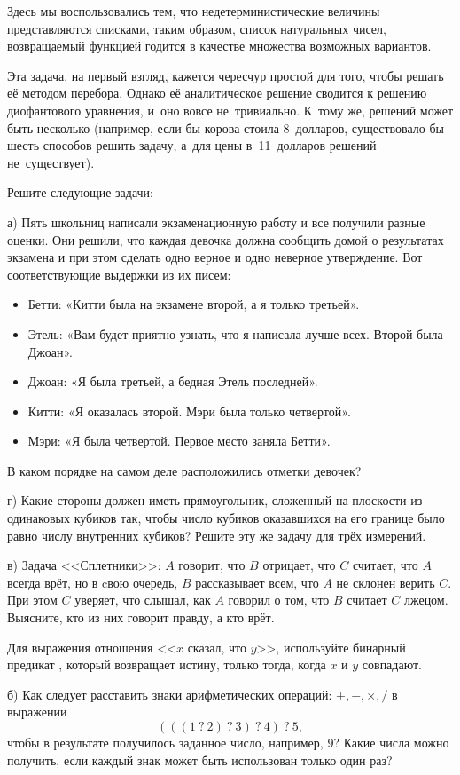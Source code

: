 Здесь мы воспользовались тем, что недетерминистические величины представляются списками, таким образом, список натуральных чисел, возвращаемый функцией  годится в качестве множества возможных вариантов.

Эта задача, на первый взгляд, кажется чересчур простой для того, чтобы решать её методом перебора. Однако её аналитическое решение сводится к решению диофантового уравнения, и~оно вовсе не~тривиально. К~тому же, решений может быть несколько (например, если бы корова стоила 8~долларов, существовало бы шесть способов решить задачу, а~для цены в~11~долларов решений не~существует).

\begin{Assignment}
Решите следующие задачи:

\medskip
а) Пять школьниц написали экзаменационную работу и все получили разные оценки. Они решили, что каждая девочка должна сообщить домой о результатах экзамена и при этом сделать одно верное и
одно неверное утверждение. Вот соответствующие выдержки из их писем:
\begin{itemize}
  \item Бетти: «Китти была на экзамене второй, а я только третьей».
  \item Этель: «Вам будет приятно узнать, что я написала лучше всех. Второй была Джоан».
  \item Джоан: «Я была третьей, а бедная Этель последней».
  \item Китти: «Я оказалась второй. Мэри была только четвертой».
  \item Мэри: «Я была четвертой. Первое место заняла Бетти».
\end{itemize}
 В каком порядке на самом деле расположились отметки девочек?
 
 \medskip
 г)\label{as:rectangles} Какие стороны должен иметь прямоугольник, сложенный на плоскости из одинаковых кубиков так, чтобы число кубиков оказавшихся на его границе было равно числу внутренних кубиков? Решите эту же задачу для трёх измерений.

  \medskip
 в) Задача <<Сплетники>>: $A$ говорит, что $B$ отрицает, что $C$ считает, что $A$ всегда врёт, но в cвою очередь, $B$ рассказывает всем, что $A$ не склонен верить $C$. При этом $C$ уверяет, что слышал, как $A$ говорил о том, что $B$ считает $C$ лжецом. Выясните, кто из них говорит правду, а кто врёт.
 
 Для выражения отношения <<$x$ сказал, что $y$>>, используйте бинарный предикат , который возвращает истину, только тогда, когда $x$ и $y$ совпадают.

\medskip
 б) Как следует расставить знаки арифметических операций: $+, -, \times, /$ в выражении $$(((1~?~2)~?~3)~?~4)~?~5,$$ чтобы в результате получилось заданное число, например, $9$? Какие числа можно получить, если каждый знак может быть использован только один раз?
\end{Assignment}



